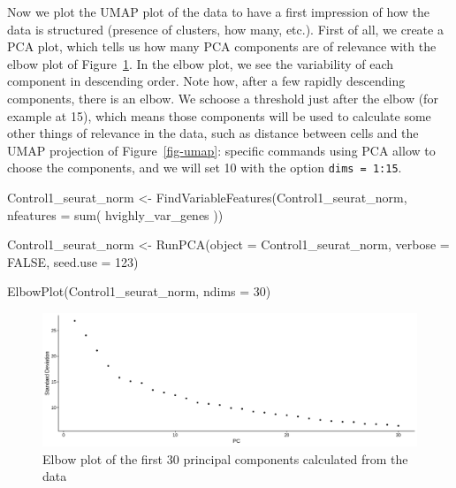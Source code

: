 \documentclass[
  letterpaper,
  DIV=11,
  numbers=noendperiod]{scrartcl}
\newenvironment{Shaded}{\begin{snugshade}}{\end{snugshade}}
\newcommand{\AttributeTok}[1]{\textcolor[rgb]{0.49,0.56,0.16}{#1}}
\newcommand{\ConstantTok}[1]{\textcolor[rgb]{0.53,0.00,0.00}{#1}}
\newcommand{\DecValTok}[1]{\textcolor[rgb]{0.25,0.63,0.44}{#1}}
\newcommand{\FunctionTok}[1]{\textcolor[rgb]{0.02,0.16,0.49}{#1}}
\newcommand{\NormalTok}[1]{\textcolor[rgb]{0.00,0.44,0.13}{#1}}
\newcommand{\OtherTok}[1]{\textcolor[rgb]{0.00,0.44,0.13}{#1}}
\begin{document}
Now we plot the UMAP plot of the data to have a first impression of how
the data is structured (presence of clusters, how many, etc.). First of
all, we create a PCA plot, which tells us how many PCA components are of
relevance with the elbow plot of Figure~\ref{fig-elbow}. In the elbow
plot, we see the variability of each component in descending order. Note
how, after a few rapidly descending components, there is an elbow. We
schoose a threshold just after the elbow (for example at 15), which
means those components will be used to calculate some other things of
relevance in the data, such as distance between cells and the UMAP
projection of Figure~\ref{fig-umap}: specific commands using PCA allow
to choose the components, and we will set 10 with the option
\texttt{dims\ =\ 1:15}.

\begin{Shaded}
\begin{Highlighting}[]
\NormalTok{Control1\_seurat\_norm }\OtherTok{\textless{}{-}} \FunctionTok{FindVariableFeatures}\NormalTok{(Control1\_seurat\_norm,}
                                                     \AttributeTok{nfeatures =} \FunctionTok{sum}\NormalTok{( hvighly\_var\_genes ))}
\end{Highlighting}
\end{Shaded}

\begin{Shaded}
\begin{Highlighting}[]
\NormalTok{Control1\_seurat\_norm }\OtherTok{\textless{}{-}} \FunctionTok{RunPCA}\NormalTok{(}\AttributeTok{object =}\NormalTok{ Control1\_seurat\_norm, }
                                        \AttributeTok{verbose =} \ConstantTok{FALSE}\NormalTok{, }\AttributeTok{seed.use =} \DecValTok{123}\NormalTok{)}
\end{Highlighting}
\end{Shaded}

\begin{Shaded}
\begin{Highlighting}[]
\FunctionTok{ElbowPlot}\NormalTok{(Control1\_seurat\_norm, }\AttributeTok{ndims =} \DecValTok{30}\NormalTok{)}
\end{Highlighting}
\end{Shaded}

\begin{figure}[H]

{\centering \includegraphics{notebook_files/figure-pdf/fig-elbow-output-1.png}

}

\caption{\label{fig-elbow}Elbow plot of the first 30 principal
components calculated from the data}

\end{figure}
\end{document}
